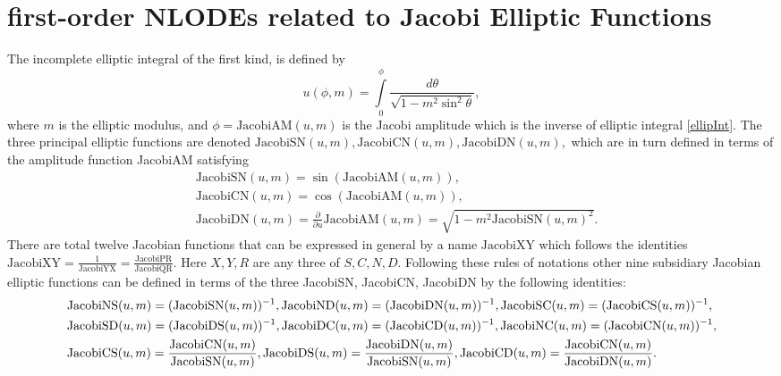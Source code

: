 \documentclass[prd,aps,floats,showkeys,nofootinbib,notitlepage]{revtex4-2}
\begin{document}
	\renewcommand{\theequation}{C-\arabic{equation}}
	\section{first-order NLODEs related to Jacobi Elliptic Functions}\label{sec:appenC}
	The incomplete elliptic integral of the first kind, is defined by
	\begin{equation}\label{ellipInt}
		u(\phi,m) = \int\limits_0^\phi  {\frac{{d\theta }}{{\sqrt {1 - {m^2}{{\sin }^2}\theta } }}},
	\end{equation}
	where $m$ is the elliptic modulus, and $\phi=\text{JacobiAM}(u,m)$ is the Jacobi amplitude which is the inverse of  elliptic integral \eqref{ellipInt}. The three principal elliptic functions are denoted $\text{JacobiSN}(u,m),\text{JacobiCN}(u,m),\text{JacobiDN}(u,m),$ which are in turn defined in terms of the amplitude function JacobiAM satisfying
	\begin{align}
		&\text{JacobiSN}(u,m)=\sin\left(\text{JacobiAM}(u,m)\right),\\
		&\text{JacobiCN}(u,m)=\cos\left(\text{JacobiAM}(u,m)\right),\\
		&\text{JacobiDN}(u,m)=\frac{\partial}{\partial u}\text{JacobiAM}(u,m)=\sqrt{1-m^2\text{JacobiSN}(u,m)^2}.
	\end{align}
	There are total twelve Jacobian functions that can be expressed in general by a name $\text{JacobiXY}$ which follows the identities $\text{JacobiXY}=\frac{1}{\text{JacobiYX}}=\frac{\text{JacobiPR}}{\text{JacobiQR}}$. Here $X,Y,R$ are any three of $S,C,N,D$. Following these rules of notations other nine subsidiary Jacobian elliptic functions can be defined in terms of the three JacobiSN, JacobiCN, JacobiDN by the following identities:
	\begin{align}
		&  {\text{JacobiNS}}(u,m) = {({\text{JacobiSN}}(u,m))^{ - 1}},{\text{JacobiND}}(u,m) = {({\text{JacobiDN}}(u,m))^{ - 1}},{\text{JacobiSC}}(u,m) = {({\text{JacobiCS}}(u,m))^{ - 1}}, \hfill\nonumber \\
		& {\text{JacobiSD}}(u,m) = {({\text{JacobiDS}}(u,m))^{ - 1}},{\text{JacobiDC}}(u,m) = {({\text{JacobiCD}}(u,m))^{ - 1}}, {\text{JacobiNC}}(u,m) = {({\text{JacobiCN}}(u,m))^{ - 1}},\nonumber\\
		&{\text{JacobiCS}}(u,m) = \frac{{{\text{JacobiCN}}(u,m)}}{{{\text{JacobiSN}}(u,m)}},{\text{JacobiDS}}(u,m) = \frac{{{\text{JacobiDN}}(u,m)}}{{{\text{JacobiSN}}(u,m)}},{\text{JacobiCD}}(u,m) = \frac{{{\text{JacobiCN}}(u,m)}}{{{\text{JacobiDN}}(u,m)}}.
	\end{align}
\end{document}
